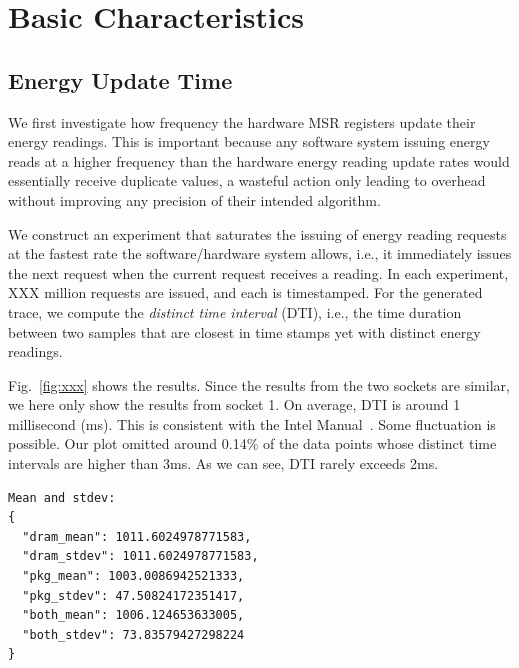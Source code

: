 \section{Basic Characteristics}

\subsection{Energy Update Time}

We first investigate how frequency the hardware MSR registers update their energy readings. This is important because any software system issuing energy reads at a higher frequency than the hardware energy reading update rates would essentially receive duplicate values, a wasteful action only leading to overhead without improving any precision of their intended algorithm.

We construct an experiment that saturates the issuing of energy reading requests at the fastest rate the software/hardware system allows, i.e., it immediately issues the next request when the current request receives a reading. In each experiment, XXX  million requests are issued, and each is timestamped. For the generated trace, we compute the \emph{distinct time interval} (DTI), i.e., the time duration between two samples that are closest in time stamps yet with distinct energy readings. 


Fig.~\ref{fig:xxx} shows the results. Since the results from the two sockets are similar, we here only show the results from socket 1. On average, DTI is around 1 millisecond (ms). This is consistent with the Intel Manual~\cite{}. Some fluctuation is possible. Our plot omitted around 0.14\% of the data points whose distinct time intervals are higher than 3ms. As we can see, DTI rarely exceeds 2ms. 

\begin{verbatim}
Mean and stdev:
{
  "dram_mean": 1011.6024978771583,
  "dram_stdev": 1011.6024978771583,
  "pkg_mean": 1003.0086942521333,
  "pkg_stdev": 47.50824172351417,
  "both_mean": 1006.124653633005,
  "both_stdev": 73.83579427298224
}
\end{verbatim}

